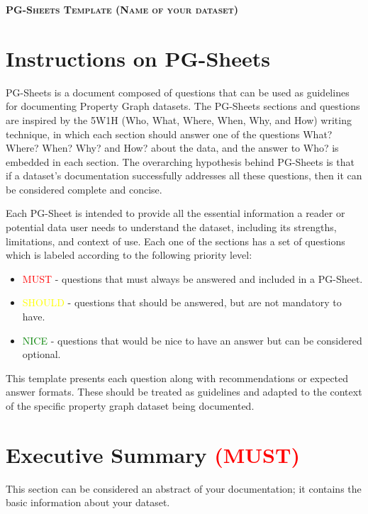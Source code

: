 \documentclass[letterpaper,11pt]{article}
\begin{document}
\begin{center}
  \textbf{\LARGE\scshape PG-Sheets Template (Name of your dataset)} \\
  \vspace{1pt}\small
\end{center}

\section{Instructions on PG-Sheets}
PG-Sheets is a document composed of questions that can be used as guidelines for documenting Property Graph datasets. 
The PG-Sheets sections and questions are inspired by the 5W1H (Who, What, Where, When, Why, and How) writing technique, in which each section should answer one of the questions What? Where? When? Why? and How? about the data, and the answer to Who? is embedded in each section. The overarching hypothesis behind PG-Sheets is that if a dataset’s documentation successfully addresses all these questions, then it can be considered complete and concise.

Each PG-Sheet is intended to provide all the essential information a reader or potential data user needs to understand the dataset, including its strengths, limitations, and context of use.
Each one of the sections has a set of questions which is labeled according to the following priority level:
\begin{itemize}
    \item \textcolor{red}{MUST} - questions that must always be answered and included in a PG-Sheet. 
    \item \textcolor{yellow}{SHOULD} - questions that should be answered, but are not mandatory to have.
    \item \textcolor{green}{NICE} - questions that would be nice to have an answer but can be considered optional. 
\end{itemize}

This template presents each question along with recommendations or expected answer formats. These should be treated as guidelines and adapted to the context of the specific property graph dataset being documented.

\section{Executive Summary \textcolor{red}{(MUST)}}

This section can be considered an abstract of your documentation; it contains the basic information about your dataset. 
\end{document}
